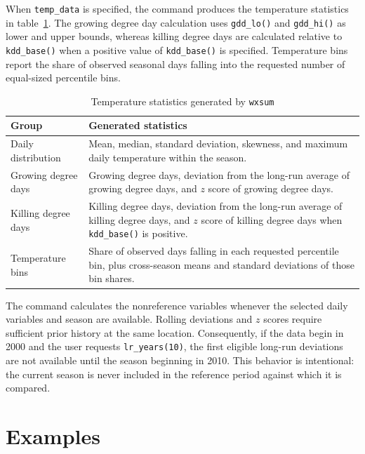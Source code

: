 When \texttt{temp\_data} is specified, the command produces the temperature statistics in table~\ref{tab:tempout}. The growing degree day calculation uses \texttt{gdd\_lo()} and \texttt{gdd\_hi()} as lower and upper bounds, whereas killing degree days are calculated relative to \texttt{kdd\_base()} when a positive value of \texttt{kdd\_base()} is specified. Temperature bins report the share of observed seasonal days falling into the requested number of equal-sized percentile bins.

\begin{table}[htbp]
\caption{Temperature statistics generated by \texttt{wxsum}}
\label{tab:tempout}
\begin{center}
\begin{tabularx}{\textwidth}{lX}
\hline
Group & Generated statistics \\
\hline
Daily distribution & Mean, median, standard deviation, skewness, and maximum daily temperature within the season. \\
Growing degree days & Growing degree days, deviation from the long-run average of growing degree days, and $z$ score of growing degree days. \\
Killing degree days & Killing degree days, deviation from the long-run average of killing degree days, and $z$ score of killing degree days when \texttt{kdd\_base()} is positive. \\
Temperature bins & Share of observed days falling in each requested percentile bin, plus cross-season means and standard deviations of those bin shares. \\
\hline
\end{tabularx}
\end{center}
\end{table}

The command calculates the nonreference variables whenever the selected daily variables and season are available. Rolling deviations and $z$ scores require sufficient prior history at the same location. Consequently, if the data begin in 2000 and the user requests \texttt{lr\_years(10)}, the first eligible long-run deviations are not available until the season beginning in 2010. This behavior is intentional: the current season is never included in the reference period against which it is compared.

\section{Examples}

